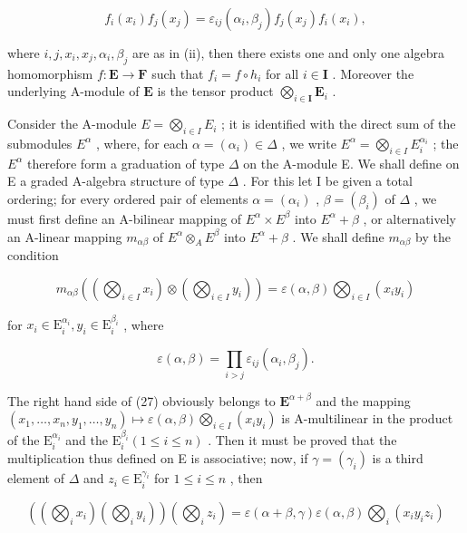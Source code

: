 \[
f _ {i} (x _ {i}) f _ {j} (x _ {j}) = \varepsilon_ {i j} (\alpha_ {i}, \beta_ {j}) f _ {j} (x _ {j}) f _ {i} (x _ {i}),\tag{26}
\]

where \(i, j, x_i, x_j, \alpha_i, \beta_j\) are as in (ii), then there exists one and only one algebra homomorphism \(f: \mathbf{E} \to \mathbf{F}\) such that \(f_i = f \circ h_i\) for all \(i \in \mathbf{I}\) . Moreover the underlying A-module of \(\mathbf{E}\) is the tensor product \(\bigotimes_{i \in \mathbf{I}} \mathbf{E}_i\) .

Consider the A-module \(E = \bigotimes_{i \in I} E_i\) ; it is identified with the direct sum of the submodules \(E^\alpha\) , where, for each \(\alpha = (\alpha_i) \in \Delta\) , we write \(E^\alpha = \bigotimes_{i \in I} E_i^{\alpha_i}\) ; the \(E^\alpha\) therefore form a graduation of type \(\Delta\) on the A-module E. We shall define on E a graded A-algebra structure of type \(\Delta\) . For this let I be given a total ordering; for every ordered pair of elements \(\alpha = (\alpha_i)\) , \(\beta = (\beta_i)\) of \(\Delta\) , we must first define an A-bilinear mapping of \(E^\alpha \times E^\beta\) into \(E^\alpha + \beta\) , or alternatively an A-linear mapping \(m_{\alpha\beta}\) of \(E^\alpha \otimes_A E^\beta\) into \(E^\alpha + \beta\) . We shall define \(m_{\alpha\beta}\) by the condition

\[
m _ {\alpha \beta} \left(\left(\bigotimes_ {i \in I} x _ {i}\right) \otimes \left(\bigotimes_ {i \in I} y _ {i}\right)\right) = \varepsilon (\alpha , \beta) \bigotimes_ {i \in I} (x _ {i} y _ {i})\tag{27}
\]

for \(x_{i}\in \mathrm{E}_{i}^{\alpha_{i}},y_{i}\in \mathrm{E}_{i}^{\beta_{i}}\) , where

\[
\varepsilon (\alpha , \beta) = \prod_ {i > j} \varepsilon_ {i j} (\alpha_ {i}, \beta_ {j}).\tag{28}
\]

The right hand side of (27) obviously belongs to \(\mathbf{E}^{\alpha +\beta}\) and the mapping \((x_{1},\ldots ,x_{n},y_{1},\ldots ,y_{n})\mapsto \varepsilon (\alpha ,\beta)\bigotimes_{i\in I}(x_{i}y_{i})\) is A-multilinear in the product of the \(\mathrm{E}_i^{\alpha_i}\) and the \(\mathrm{E}_i^{\beta_i}(1\leqslant i\leqslant n)\) . Then it must be proved that the multiplication thus defined on E is associative; now, if \(\gamma = (\gamma_{i})\) is a third element of \(\Delta\) and \(z_{i} \in \mathrm{E}_{i}^{\gamma_{i}}\) for \(1 \leqslant i \leqslant n\) , then

\[
\left(\left(\bigotimes_ {i} x _ {i}\right) \left(\bigotimes_ {i} y _ {i}\right)\right) \left(\bigotimes_ {i} z _ {i}\right) = \varepsilon (\alpha + \beta , \gamma) \varepsilon (\alpha , \beta) \bigotimes_ {i} (x _ {i} y _ {i} z _ {i})
\]


